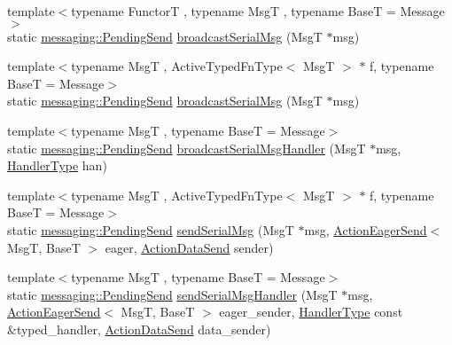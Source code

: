 \begin{DoxyCompactItemize}
{\footnotesize template$<$typename FunctorT , typename MsgT , typename BaseT  = Message$>$ }\\static \hyperlink{structvt_1_1messaging_1_1_pending_send}{messaging\+::\+Pending\+Send} \hyperlink{structvt_1_1serialization_1_1_serialized_messenger_a2e905fb9eca8c4352522f998f94f4de8}{broadcast\+Serial\+Msg} (MsgT $\ast$msg)
\item 
{\footnotesize template$<$typename MsgT , Active\+Typed\+Fn\+Type$<$ Msg\+T $>$ $\ast$ f, typename BaseT  = Message$>$ }\\static \hyperlink{structvt_1_1messaging_1_1_pending_send}{messaging\+::\+Pending\+Send} \hyperlink{structvt_1_1serialization_1_1_serialized_messenger_a2a1f3beaf021915bcf3bcaa224895cbb}{broadcast\+Serial\+Msg} (MsgT $\ast$msg)
\item 
{\footnotesize template$<$typename MsgT , typename BaseT  = Message$>$ }\\static \hyperlink{structvt_1_1messaging_1_1_pending_send}{messaging\+::\+Pending\+Send} \hyperlink{structvt_1_1serialization_1_1_serialized_messenger_a75710db0c5f165ae4939a73571a311a2}{broadcast\+Serial\+Msg\+Handler} (MsgT $\ast$msg, \hyperlink{namespacevt_af64846b57dfcaf104da3ef6967917573}{Handler\+Type} han)
\item 
{\footnotesize template$<$typename MsgT , Active\+Typed\+Fn\+Type$<$ Msg\+T $>$ $\ast$ f, typename BaseT  = Message$>$ }\\static \hyperlink{structvt_1_1messaging_1_1_pending_send}{messaging\+::\+Pending\+Send} \hyperlink{structvt_1_1serialization_1_1_serialized_messenger_a5e8450f7c97e407703b61dd1ed047eb8}{send\+Serial\+Msg} (MsgT $\ast$msg, \hyperlink{namespacevt_1_1serialization_a009aa1de8d42a3c97643b947fcc6f0b6}{Action\+Eager\+Send}$<$ MsgT, BaseT $>$ eager, \hyperlink{namespacevt_1_1serialization_afffcac0da80b78e77ef8043dba4e814f}{Action\+Data\+Send} sender)
\item 
{\footnotesize template$<$typename MsgT , typename BaseT  = Message$>$ }\\static \hyperlink{structvt_1_1messaging_1_1_pending_send}{messaging\+::\+Pending\+Send} \hyperlink{structvt_1_1serialization_1_1_serialized_messenger_ad42536151cbfb8cd42e9c8431c3d58b7}{send\+Serial\+Msg\+Handler} (MsgT $\ast$msg, \hyperlink{namespacevt_1_1serialization_a009aa1de8d42a3c97643b947fcc6f0b6}{Action\+Eager\+Send}$<$ MsgT, BaseT $>$ eager\+\_\+sender, \hyperlink{namespacevt_af64846b57dfcaf104da3ef6967917573}{Handler\+Type} const \&typed\+\_\+handler, \hyperlink{namespacevt_1_1serialization_afffcac0da80b78e77ef8043dba4e814f}{Action\+Data\+Send} data\+\_\+sender)
\end{DoxyCompactItemize}


